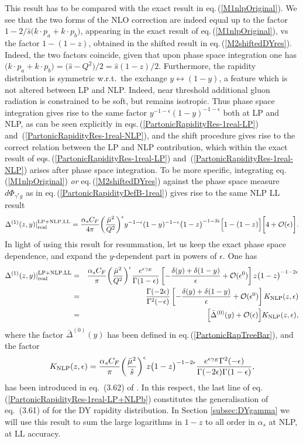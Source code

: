 \documentclass[11pt]{article}
\newcommand{\be}{\begin{equation}}
\newcommand{\ee}{\end{equation}}
\newcommand{\bea}{\begin{eqnarray}}
\newcommand{\eea}{\end{eqnarray}}
\newcommand{\nn}{\nonumber}
\newcommand{\ord}{{\cal O}}
\newcommand{\as}{\alpha_s}
\newcommand{\eps}{\epsilon}
\newcommand{\s}{\hat{s}}
\newcommand\eqn[1]     {eq.\,(\ref{#1})}
\newcommand\eqns[2]    {eqs.\,(\ref{#1}) and~(\ref{#2})}
\begin{document}
This result has to be compared with the 
exact result in \eqn{M1nlpOriginal}. We see 
that the two forms of the NLO correction are 
indeed equal up to the factor $1 - 2/\hat{s}
\big(k \cdot p_a + k \cdot p_b\big)$,
appearing in the exact result of \eqn{M1nlpOriginal}, 
vs the factor $1 - (1-z)$, obtained in the shifted 
result in \eqn{M2shiftedDYres}. Indeed, the two factors
coincide, given that upon phase space integration 
one has $\big(k \cdot p_a + k \cdot p_b\big) 
= \big(\hat{s}-Q^2\big)/2=\hat{s}(1-z)/2$. 
Furthermore, the rapidity distribution 
is symmetric w.r.t.\ the exchange 
$y \leftrightarrow (1-y)$, a feature 
which is not altered between LP and 
NLP. Indeed, near threshold additional 
gluon radiation is constrained to be soft, 
but remains isotropic. Thus phase space 
integration gives rise to the same factor 
$y^{-1-\eps}(1-y)^{-1-\eps}$ both at LP 
and NLP, as can be seen explicitly in 
\eqns{PartonicRapidityRes-1real-LP}{PartonicRapidityRes-1real-NLP},
and the shift procedure gives rise to the correct 
relation between the LP and NLP contribution, 
which within the exact result of 
\eqns{PartonicRapidityRes-1real-LP}{PartonicRapidityRes-1real-NLP} 
arises after phase space integration. 
To be more specific, integrating \eqn{M1nlpOriginal}
\emph{or} \eqn{M2shiftedDYres} against the phase space measure 
$d\Phi_{\gamma^*g} $ as in \eqn{PartonicRapidityDefB-1real}
gives rise to the same NLP LL result
\be\label{PartonicRapidityRes-1real-LP+NLP} 
\Delta^{(1)}(z,y)|_{\rm real}^{\rm LP+NLP,LL}
= \frac{\as C_F}{4\pi} 
\bigg( \frac{\bar{\mu}^2}{Q^2}\bigg)^{\eps} 
y^{-1-\eps}(1-y)^{-1-\eps} 
\big(1-z\big)^{-1-2\eps} 
\Big[1 - (1-z) \Big]
\bigg[4 + \ord(\eps)\bigg].
\ee
In light of using this result for 
resummation, let us keep the exact phase 
space dependence, and expand the $y$-dependent part in powers of 
$\eps$. One has
\bea\label{PartonicRapidityRes-1real-LP+NLPb} \nn
\Delta^{(1)}(z,y)|_{\rm real}^{\rm LP+NLP,LL}
&=& \frac{\as C_F}{\pi} 
\bigg( \frac{\bar{\mu}^2}{Q^2}\bigg)^{\eps} 
\frac{e^{\eps\gamma_E}}{\Gamma(1-\eps)}
\left[-\frac{\delta(y)+\delta(1-y)}{\eps}+\ord(\eps^0)\right]
z \big(1-z\big)^{-1-2\eps} \\ \nn
&=& \frac{\Gamma(-2\eps)}{\Gamma^2(-\eps)}
\left[-\frac{\delta(y)+\delta(1-y)}{\eps}+\ord(\eps^0)\right]
K_{\rm{NLP}}(z,\eps) \\ 
&=& \Big[\bar \Delta^{(0)}(y) +\ord(\eps) \Big]
K_{\rm{NLP}}(z,\eps),
\eea
where the factor $\bar \Delta^{(0)}(y)$ 
has been defined in \eqn{PartonicRapTreeBar},
and the factor 
\be\label{KNLP}
K_{\rm{NLP}}(z,\eps) = \frac{\as C_F}{\pi} 
\bigg( \frac{\bar{\mu}^2}{\s}\bigg)^{\eps}
z \big(1-z\big)^{-1-2\eps}
\frac{e^{\eps \gamma_E}\Gamma^2(-\eps)}{
\Gamma(-2\eps)\Gamma(1-\eps)},
\ee
has been introduced in eq.\ (3.62) of 
\cite{Bahjat-Abbas:2019fqa}. In this respect, the last line of \eqn{PartonicRapidityRes-1real-LP+NLPb} 
constitutes the generalisation of eq.\ (3.61) 
of \cite{Bahjat-Abbas:2019fqa} for 
the DY rapidity distribution. In Section 
\ref{subsec:DYgamma} we will use this 
result to sum the large logarithms in $1-z$
to all order in $\as$ at NLP, at LL accuracy.
\end{document}
